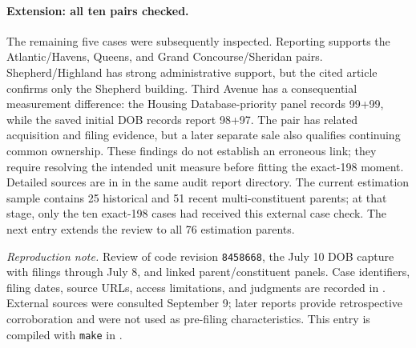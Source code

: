 \paragraph{Extension: all ten pairs checked.} The remaining five cases were subsequently inspected. Reporting supports the Atlantic/Havens, Queens, and Grand Concourse/Sheridan pairs. Shepherd/Highland has strong administrative support, but the cited article confirms only the Shepherd building. Third Avenue has a consequential measurement difference: the Housing Database-priority panel records 99+99, while the saved initial DOB records report 98+97. The pair has related acquisition and filing evidence, but a later separate sale also qualifies continuing common ownership. These findings do not establish an erroneous link; they require resolving the intended unit measure before fitting the exact-198 moment. Detailed sources are in  in the same audit report directory. The current estimation sample contains 25 historical and 51 recent multi-constituent parents; at that stage, only the ten exact-198 cases had received this external case check. The next entry extends the review to all 76 estimation parents.

\textit{Reproduction note.} Review of code revision \texttt{8458668}, the July 10 DOB capture with filings through July 8, and linked parent/constituent panels. Case identifiers, filing dates, source URLs, access limitations, and judgments are recorded in . External sources were consulted September 9; later reports provide retrospective corroboration and were not used as pre-filing characteristics. This entry is compiled with \texttt{make} in .
